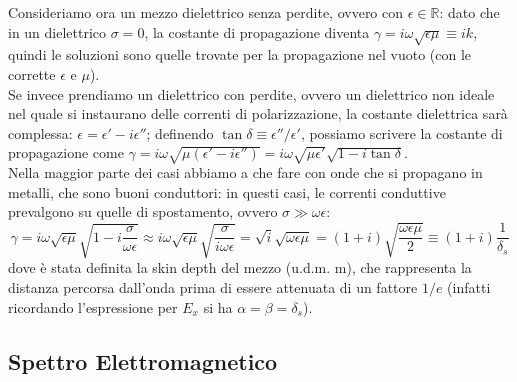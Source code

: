 \documentclass[]{article}
\begin{document}
%
Consideriamo ora un mezzo dielettrico senza perdite, ovvero con $ \epsilon\in\mathbb{R} $: dato che in un dielettrico $ \sigma = 0 $, la costante di propagazione diventa $ \gamma = i \omega \sqrt{\epsilon\mu} \equiv i k $, quindi le soluzioni sono quelle trovate per la propagazione nel vuoto (con le corrette $ \epsilon $ e $ \mu $). \\ 
Se invece prendiamo un dielettrico con perdite, ovvero un dielettrico non ideale nel quale si instaurano delle correnti di polarizzazione, la costante dielettrica sarà complessa: $ \epsilon = \epsilon' - i \epsilon'' $; definendo $ \tan\delta \equiv \epsilon'' / \epsilon' $, possiamo scrivere la costante di propagazione come $ \gamma = i \omega \sqrt{\mu(\epsilon' - i \epsilon'')} = i \omega \sqrt{\mu \epsilon'} \sqrt{1 - i \tan\delta} $. \\ 
%
Nella maggior parte dei casi abbiamo a che fare con onde che si propagano in metalli, che sono buoni conduttori: in questi casi, le correnti conduttive prevalgono su quelle di spostamento, ovvero $ \sigma \gg \omega\epsilon $:
\begin{equation}
	\gamma = i \omega \sqrt{\epsilon\mu} \sqrt{1 - i \frac{\sigma}{\omega\epsilon}} \approx i \omega \sqrt{\epsilon\mu} \sqrt{\frac{\sigma}{i \omega \epsilon}} = \sqrt{i} \sqrt{\omega\epsilon\mu} = (1 + i) \sqrt{\frac{\omega\epsilon\mu}{2}} \equiv (1 + i) \frac{1}{\delta_s}
	\label{eq:23}
\end{equation}
dove è stata definita la skin depth del mezzo (u.d.m. $ \text{m} $), che rappresenta la distanza percorsa dall'onda prima di essere attenuata di un fattore $ 1/e $ (infatti ricordando l'espressione per $ E_x $ si ha $ \alpha = \beta = \delta_s $).

\subsection{Spettro Elettromagnetico}
\end{document}
